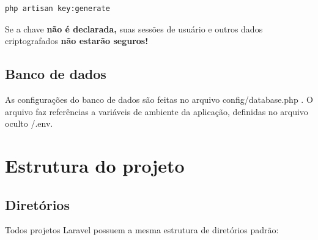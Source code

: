 \documentclass[
12pt,				%
openany,			%
twoside,			%
a4paper,			%
english,			%
french,				%
spanish,			%
brazil,				%
]{abntex2}
\begin{document}
\begin{lstlisting}[style=bash,caption={Gerando chave de aplicação}]
    php artisan key:generate
\end{lstlisting}

\begin{leftbar}
    Se a chave \textbf{não é declarada,} suas sessões de usuário e outros dados criptografados \textbf{não estarão seguros!}
\end{leftbar}

\subsection{Banco de dados}
As configurações do banco de dados são feitas no arquivo config/database.php . O
arquivo faz referências a variáveis de ambiente da aplicação, definidas no arquivo oculto /.env.

\section{Estrutura do projeto}

\subsection{Diretórios}
Todos projetos Laravel possuem a mesma estrutura de diretórios padrão:
\end{document}
